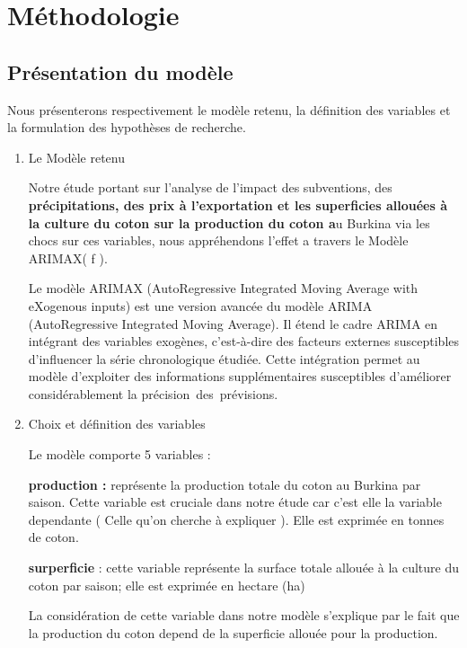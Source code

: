 \documentclass[
  letterpaper,
  DIV=11,
  numbers=noendperiod]{scrartcl}
\begin{document}
\section{Méthodologie}\label{muxe9thodologie}

\subsection{Présentation du modèle}\label{pruxe9sentation-du-moduxe8le}

Nous présenterons respectivement le modèle retenu, la définition des
variables et la formulation des hypothèses de recherche.

\begin{enumerate}
\def\labelenumi{\arabic{enumi}.}
\item
  Le Modèle retenu

  Notre étude portant sur l'analyse de l'impact des subventions, des
  \textbf{précipitations, des prix à l'exportation et les superficies
  allouées à la culture du coton sur la production du coton a}u Burkina
  via les chocs sur ces variables, nous appréhendons l'effet a travers
  le Modèle ARIMAX( f ).

  Le modèle ARIMAX (AutoRegressive Integrated Moving Average with
  eXogenous inputs) est une version avancée du modèle ARIMA
  (AutoRegressive Integrated Moving Average). Il étend le cadre ARIMA en
  intégrant des variables exogènes, c'est-à-dire des facteurs externes
  susceptibles d'influencer la série chronologique étudiée. Cette
  intégration permet au modèle d'exploiter des informations
  supplémentaires susceptibles d'améliorer considérablement la
  précision~des~prévisions.
\item
  Choix et définition des variables

  Le modèle comporte 5 variables :

  \textbf{production :} représente la production totale du coton au
  Burkina par saison. Cette variable est cruciale dans notre étude car
  c'est elle la variable dependante ( Celle qu'on cherche à expliquer ).
  Elle est exprimée en tonnes de coton.

  \textbf{surperficie} : cette variable représente la surface totale
  allouée à la culture du coton par saison; elle est exprimée en hectare
  (ha)

  La considération de cette variable dans notre modèle s'explique par le
  fait que la production du coton depend de la superficie allouée pour
  la production.


\end{enumerate}
\end{document}
